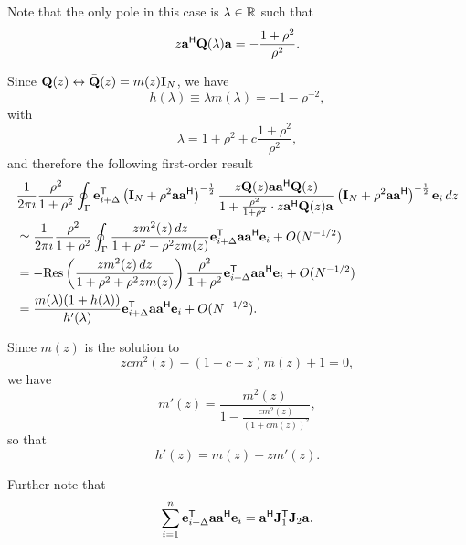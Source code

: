 \documentclass[11pt,a4paper]{article}
\begin{document}
Note that the only pole in this case is $\lambda \in {\mathbb{R}}$ such that
\begin{equation}
	z \mathbf{a}^{\sf H} {\mathbf{Q}}(\lambda) \mathbf{a} = - \frac{1 + \rho^2}{\rho^2}.
\end{equation}

Since ${\mathbf{Q}}(z) \leftrightarrow \bar {{\mathbf{Q}}}(z) = m(z) \mathbf{I}_N$, we have 
\begin{equation}
	h(\lambda) \equiv \lambda m(\lambda) = -1 - \rho^{-2},
\end{equation}
with
\begin{equation}
	\lambda = 1 + \rho^2 + c \frac{1+\rho^2}{\rho^2},
\end{equation}
and therefore the following first-order result 
\begin{align*}
	&\frac1{2 \pi \imath} \frac{ \rho^2 }{1 + \rho^2} \oint_{\Gamma} \mathbf{e}_{i + \Delta}^{\sf T} \left(\mathbf{I}_N + \rho^2 \mathbf{a} \mathbf{a}^{\sf H} \right)^{-\frac12} \frac{z {\mathbf{Q}}(z) \mathbf{a} \mathbf{a}^{\sf H} {\mathbf{Q}}(z)}{ 1 + \frac{ \rho^2 }{1 + \rho^2} \cdot z \mathbf{a}^{\sf H} {\mathbf{Q}}(z) \mathbf{a} } \left(\mathbf{I}_N + \rho^2 \mathbf{a} \mathbf{a}^{\sf H} \right)^{-\frac12} \mathbf{e}_{i}\,dz \\ 
	&\simeq \frac1{2 \pi \imath} \frac{ \rho^2 }{1 + \rho^2} \oint_{\Gamma} \frac{  z m^2(z) \,dz }{ 1+ \rho^2 + \rho^2 z m(z) }  \mathbf{e}_{i + \Delta}^{\sf T} \mathbf{a} \mathbf{a}^{\sf H} \mathbf{e}_{i} + O(N^{-1/2}) \\ 
	&= -{\rm Res} \left( \frac{  z m^2(z) \,dz }{ 1+ \rho^2 + \rho^2 z m(z) } \right) \frac{ \rho^2 }{1 + \rho^2} \mathbf{e}_{i + \Delta}^{\sf T} \mathbf{a} \mathbf{a}^{\sf H} \mathbf{e}_{i} + O(N^{-1/2}) \\
	&= \frac{  m(\lambda) (1 + h(\lambda))}{ h'(\lambda) } \mathbf{e}_{i + \Delta}^{\sf T} \mathbf{a} \mathbf{a}^{\sf H} \mathbf{e}_{i} + O(N^{-1/2}).
\end{align*}

Since $m(z)$ is the solution to 
\begin{equation}
	z c m^2(z) - (1 - c - z) m(z) + 1 = 0,
\end{equation}
we have 
\begin{equation}
	m'(z) = \frac{m^2(z)}{ 1 - \frac{cm^2(z)}{(1 + cm(z))^2} },
\end{equation}
so that
\begin{equation}
	h'(z) = m(z) + z m'(z).
\end{equation}

Further note that 
\begin{equation}
	\sum_{i=1}^n \mathbf{e}_{i + \Delta}^{\sf T} \mathbf{a} \mathbf{a}^{\sf H} \mathbf{e}_{i} = \mathbf{a}^{\sf H} {\mathbf{J}}_1^{\sf T} {\mathbf{J}}_2 \mathbf{a}.
\end{equation}
\end{document}
